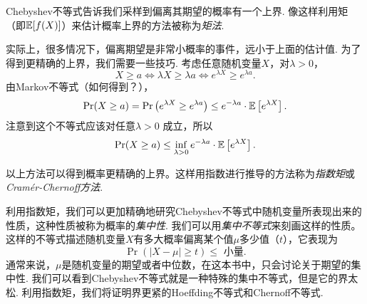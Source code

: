 Chebyshev不等式告诉我们采样到偏离其期望的概率有一个上界. 像这样利用矩（即$\mathbb{E}[f(X)]$）来估计概率上界的方法被称为\emph{矩法}. 

实际上，很多情况下，偏离期望是非常小概率的事件，远小于上面的估计值. 为了得到更精确的上界，我们需要一些技巧. 考虑任意随机变量$X$，对$\lambda >0$，
\[
X\geq a \iff \lambda X \geq \lambda a \iff e^{\lambda X} \geq e^{\lambda a}.
\]
由Markov不等式（如何得到？），
\[
\Pr(X\geq a) = \Pr\left(e^{\lambda X} \geq e^{\lambda a}\right) \leq e^{- \lambda a}\cdot \mathbb{E}\left[e^{\lambda X}\right]. 
\]
注意到这个不等式应该对任意$\lambda > 0$ 成立，所以
\[
\Pr(X\geq a) \leq \inf_{\lambda >0} e^{- \lambda a}\cdot \mathbb{E} \left[e^{\lambda X}\right].
\]

以上方法可以得到概率更精确的上界。这样用指数进行推导的方法称为\emph{指数矩}或\emph{Cramér-Chernoff方法}. 

利用指数矩，我们可以更加精确地研究Chebyshev不等式中随机变量所表现出来的性质，这种性质被称为概率的\emph{集中性}. 我们可以用\emph{集中不等式}来刻画这样的性质。这样的不等式描述随机变量$X$有多大概率偏离某个值$\mu$多少值（$t$），它表现为
\[
\Pr(| X - \mu| \geq t) \leq \text{ 小量}.
\]
通常来说，$\mu$是随机变量的期望或者中位数，在这本书中，只会讨论关于期望的集中性. 我们可以看到Chebyshev不等式就是一种特殊的集中不等式，但是它的界太松. 利用指数矩，我们将证明界更紧的Hoeffding不等式和Chernoff不等式. 

